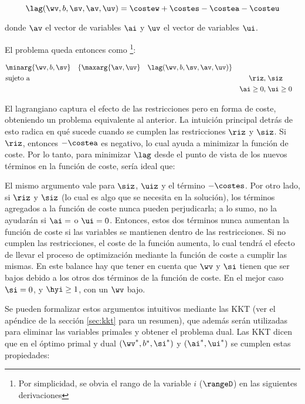 \begin{equation*}
\lag(\wv,b,\sv,\av,\uv) = \costew + \costes - \costea - \costeu 
\end{equation*}

donde $\av$ el vector de variables $\ai$ y $\uv$ el vector de variables $\ui$.

El problema queda entonces como \footnote{Por simplicidad, se obvia el rango de la variable $i$ ($\rangeD$) en las siguientes derivaciones}:

\begin{equation*}
\begin{aligned}
&    \minarg{\wv,b,\sv}  \quad
 \{   \maxarg{\av,\uv} \quad  \lag(\wv,b,\sv,\av,\uv)  \} \\
& \text{sujeto a}
&\riz, &\; \siz \\ 
& &  \ai \geq 0, &\; \ui \geq 0 
\end{aligned}
\end{equation*}


El lagrangiano captura el efecto de las restricciones pero en forma de coste, obteniendo un problema equivalente al anterior. La intuición principal detrás de esto radica en qué sucede cuando se cumplen las restricciones $\riz$ y $\siz$. Si $\riz$, entonces $- \costea$ es negativo, lo cual ayuda a minimizar la función de coste. Por lo tanto, para minimizar $\lag$  desde el punto de vista de los nuevos términos en la función de coste, sería ideal que:



El mismo argumento vale para $\siz$, $\uiz$ y el término $- \costes$. Por otro lado, si $\riz$ y $\siz$ (lo cual es algo que se necesita en la solución), los términos agregados a la función de coste nunca pueden perjudicarla; a lo sumo, no la ayudarán si $\ai=$ o $\ui =0$. Entonces, estos dos términos nunca aumentan la función de coste si las variables se mantienen dentro de las restricciones. Si no cumplen las restricciones, el coste de la función aumenta, lo cual tendrá el efecto de llevar el proceso de optimización mediante la función de coste a cumplir las mismas. En este balance hay que tener en cuenta que $\wv$ y $\si$ tienen que ser bajos debido a los otros dos términos de la función de coste. En el mejor caso $\si = 0$, y $\hyi \geq 1$, con un $\wv$ bajo. 

Se pueden formalizar estos argumentos intuitivos mediante las KKT (ver el apéndice de la sección \ref{sec:kkt} para un resumen), que además serán utilizadas para eliminar las variables primales y obtener el problema dual. Las KKT dicen que en el óptimo primal y dual $(\wv^*,b^*,\si^*)$ y $(\ai^*,\ui^*)$ se cumplen estas propiedades:



